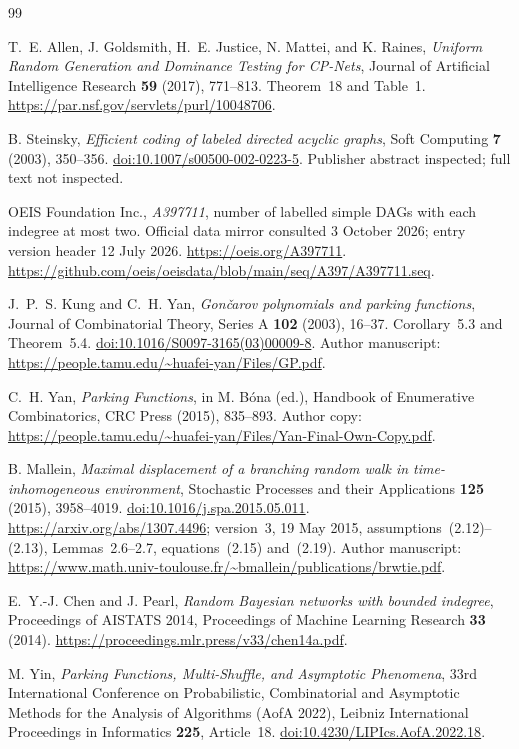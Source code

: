 \documentclass[11pt,letterpaper]{article}
\numberwithin{equation}{section}
\theoremstyle{remark}\newtheorem{remark}[theorem]{Remark}
\begin{document}
\begin{thebibliography}{99}
\raggedright
{}
T.~E. Allen, J. Goldsmith, H.~E. Justice, N. Mattei, and K. Raines,
\emph{Uniform Random Generation and Dominance Testing for CP-Nets},
Journal of Artificial Intelligence Research \textbf{59} (2017), 771--813.
Theorem~18 and Table~1.
\url{https://par.nsf.gov/servlets/purl/10048706}.

B. Steinsky, \emph{Efficient coding of labeled directed acyclic graphs},
Soft Computing \textbf{7} (2003), 350--356.
\href{https://doi.org/10.1007/s00500-002-0223-5}{doi:10.1007/s00500-002-0223-5}.
Publisher abstract inspected; full text not inspected.

OEIS Foundation Inc., \emph{A397711}, number of labelled simple DAGs
with each indegree at most two. Official data mirror consulted
3 October 2026; entry version header 12 July 2026.
\url{https://oeis.org/A397711}.
\url{https://github.com/oeis/oeisdata/blob/main/seq/A397/A397711.seq}.

J.~P.~S. Kung and C.~H. Yan, \emph{Gon\v{c}arov polynomials and parking
functions}, Journal of Combinatorial Theory, Series A \textbf{102}
(2003), 16--37. Corollary~5.3 and Theorem~5.4.
\href{https://doi.org/10.1016/S0097-3165(03)00009-8}{doi:10.1016/S0097-3165(03)00009-8}.
Author manuscript: \url{https://people.tamu.edu/~huafei-yan/Files/GP.pdf}.

C.~H. Yan, \emph{Parking Functions}, in M. B\'ona (ed.),
Handbook of Enumerative Combinatorics, CRC Press (2015), 835--893.
Author copy:
\url{https://people.tamu.edu/~huafei-yan/Files/Yan-Final-Own-Copy.pdf}.

B. Mallein, \emph{Maximal displacement of a branching random walk in
time-inhomogeneous environment}, Stochastic Processes and their
Applications \textbf{125} (2015), 3958--4019.
\href{https://doi.org/10.1016/j.spa.2015.05.011}{doi:10.1016/j.spa.2015.05.011}.
\url{https://arxiv.org/abs/1307.4496}; version~3, 19 May 2015,
assumptions~(2.12)--(2.13), Lemmas~2.6--2.7, equations~(2.15) and~(2.19).
Author manuscript:
\url{https://www.math.univ-toulouse.fr/~bmallein/publications/brwtie.pdf}.

E.~Y.-J. Chen and J. Pearl, \emph{Random Bayesian networks with bounded
indegree}, Proceedings of AISTATS 2014, Proceedings of Machine Learning
Research \textbf{33} (2014).
\url{https://proceedings.mlr.press/v33/chen14a.pdf}.

M. Yin, \emph{Parking Functions, Multi-Shuffle, and Asymptotic Phenomena},
33rd International Conference on Probabilistic, Combinatorial and
Asymptotic Methods for the Analysis of Algorithms (AofA 2022),
Leibniz International Proceedings in Informatics \textbf{225},
Article~18.
\href{https://doi.org/10.4230/LIPIcs.AofA.2022.18}{doi:10.4230/LIPIcs.AofA.2022.18}.
\end{thebibliography}
\end{document}
